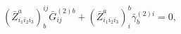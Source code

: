 \begin{equation}
\left( \bar{Z}_{i_{1}i_{2}i_{3}}^{a}\right) _{b}^{ij}\bar{G}%
_{ij}^{(2)b}+\left( \bar{Z}_{i_{1}i_{2}i_{3}}^{a}\right) _{i}^{b}\bar{\gamma}%
_{b}^{(2)i}=0,  \label{i12}
\end{equation}

